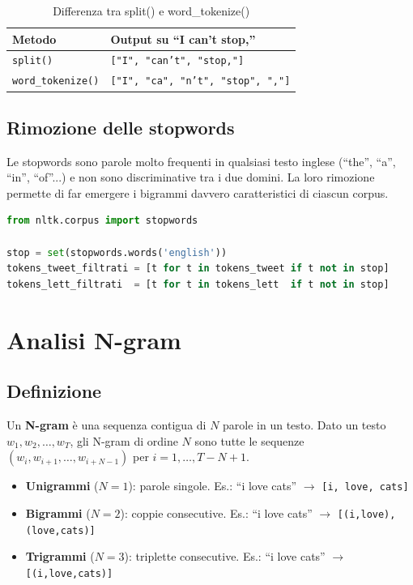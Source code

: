 \documentclass[12pt, a4paper]{article}
\begin{document}
\begin{table}[H]
\centering
\begin{tabular}{ll}
\toprule
\textbf{Metodo} & \textbf{Output su ``I can't stop,''} \\
\midrule
\texttt{split()} & \texttt{["I", "can't", "stop,"]} \\
\texttt{word\_tokenize()} & \texttt{["I", "ca", "n't", "stop", ","]} \\
\bottomrule
\end{tabular}
\caption{Differenza tra split() e word\_tokenize()}
\end{table}

\subsection{Rimozione delle stopwords}

Le stopwords sono parole molto frequenti in qualsiasi testo inglese
(``the'', ``a'', ``in'', ``of''...) e non sono discriminative tra
i due domini. La loro rimozione permette di far emergere i bigrammi
davvero caratteristici di ciascun corpus.

\begin{lstlisting}[language=Python, caption=Rimozione delle stopwords]
from nltk.corpus import stopwords

stop = set(stopwords.words('english'))
tokens_tweet_filtrati = [t for t in tokens_tweet if t not in stop]
tokens_lett_filtrati  = [t for t in tokens_lett  if t not in stop]
\end{lstlisting}

\section{Analisi N-gram}

\subsection{Definizione}

Un \textbf{N-gram} è una sequenza contigua di $N$ parole in un testo.
Dato un testo $w_1, w_2, \ldots, w_T$, gli N-gram di ordine $N$ sono
tutte le sequenze $(w_i, w_{i+1}, \ldots, w_{i+N-1})$ per
$i = 1, \ldots, T-N+1$.

\begin{itemize}[leftmargin=1.5cm]
    \item \textbf{Unigrammi} ($N=1$): parole singole.
          Es.: ``i love cats'' $\to$ \texttt{[i, love, cats]}
    \item \textbf{Bigrammi} ($N=2$): coppie consecutive.
          Es.: ``i love cats'' $\to$ \texttt{[(i,love), (love,cats)]}
    \item \textbf{Trigrammi} ($N=3$): triplette consecutive.
          Es.: ``i love cats'' $\to$ \texttt{[(i,love,cats)]}
\end{itemize}
\end{document}

